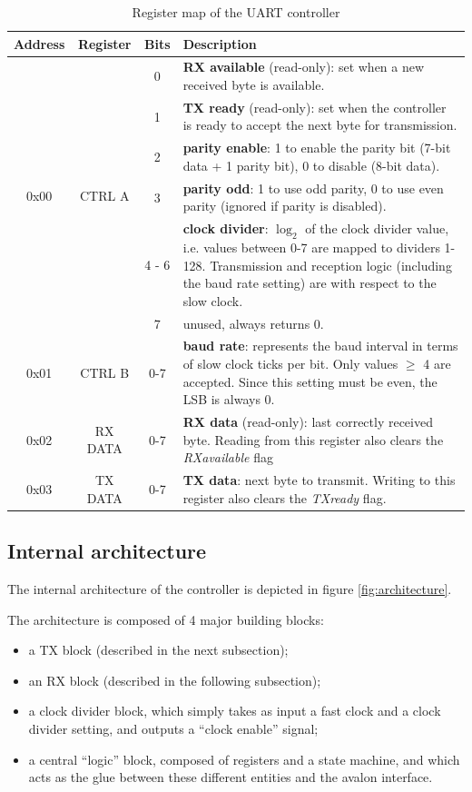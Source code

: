\documentclass[12pt,a4paper]{article}
\begin{document}
\begin{table}[ht]
	\centering
	\begin{tabularx}{\linewidth}{|c|c|c|X|}
		\hline
		Address & Register & Bits & Description \\
		\hline
		\hline
		\multirow{6}{*}{0x00} & \multirow{6}{*}{CTRL A} & 0 & \textbf{RX available} (read-only): set when a new received byte is available. \\
		 & & 1 & \textbf{TX ready} (read-only): set when the controller is ready to accept the next byte for transmission. \\
		 & & 2 & \textbf{parity enable}: 1 to enable the parity bit (7-bit data + 1 parity bit), 0 to disable (8-bit data). \\
		 & & 3 & \textbf{parity odd}: 1 to use odd parity, 0 to use even parity (ignored if parity is disabled). \\
		 & & 4 - 6 & \textbf{clock divider}: $\log_2$ of the clock divider value, i.e. values between 0-7 are mapped to dividers 1-128. Transmission and reception logic (including the baud rate setting) are with respect to the slow clock. \\
		 & & 7 & unused, always returns 0. \\
		 \hline
		 0x01 & CTRL B & 0-7 & \textbf{baud rate}: represents the baud interval in terms of slow clock ticks per bit. Only values $\geq$ 4 are accepted. Since this setting must be even, the LSB is always 0. \\
		 \hline
		 0x02 & RX DATA & 0-7 & \textbf{RX data} (read-only): last correctly received byte. Reading from this register also clears the \textit{RXavailable} flag \\
		 \hline
		 0x03 & TX DATA & 0-7 & \textbf{TX data}: next byte to transmit. Writing to this register also clears the \textit{TXready} flag.\\
		 \hline
	\end{tabularx}
	\caption{Register map of the UART controller}
	\label{tab:map}
\end{table}

\subsection{Internal architecture}

The internal architecture of the controller is depicted in figure \ref{fig:architecture}.

The architecture is composed of 4 major building blocks:
\begin{itemize}[nosep]
	\item a TX block (described in the next subsection);
	\item an RX block (described in the following subsection);
	\item a clock divider block, which simply takes as input a fast clock and a clock divider setting, and outputs a ``clock enable'' signal;
	\item a central ``logic'' block, composed of registers and a state machine, and which acts as the glue between these different entities and the avalon interface.
\end{itemize}
\end{document}
